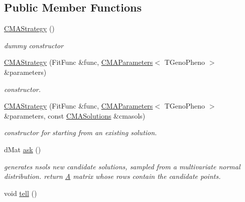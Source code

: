 \subsection*{Public Member Functions}
\begin{DoxyCompactItemize}
\item 
\hypertarget{classlibcmaes_1_1CMAStrategy_a855fbfb7dd9745ea764648f8965d1f3e}{\hyperlink{classlibcmaes_1_1CMAStrategy_a855fbfb7dd9745ea764648f8965d1f3e}{C\+M\+A\+Strategy} ()}\label{classlibcmaes_1_1CMAStrategy_a855fbfb7dd9745ea764648f8965d1f3e}

\begin{DoxyCompactList}\small\item\em dummy constructor \end{DoxyCompactList}\item 
\hyperlink{classlibcmaes_1_1CMAStrategy_a5455e7245be35c169e4144eb666f94f3}{C\+M\+A\+Strategy} (Fit\+Func \&func, \hyperlink{classlibcmaes_1_1CMAParameters}{C\+M\+A\+Parameters}$<$ T\+Geno\+Pheno $>$ \&parameters)
\begin{DoxyCompactList}\small\item\em constructor. \end{DoxyCompactList}\item 
\hyperlink{classlibcmaes_1_1CMAStrategy_a30decb362a4dd4c9557f0989d618aa93}{C\+M\+A\+Strategy} (Fit\+Func \&func, \hyperlink{classlibcmaes_1_1CMAParameters}{C\+M\+A\+Parameters}$<$ T\+Geno\+Pheno $>$ \&parameters, const \hyperlink{classlibcmaes_1_1CMASolutions}{C\+M\+A\+Solutions} \&cmasols)
\begin{DoxyCompactList}\small\item\em constructor for starting from an existing solution. \end{DoxyCompactList}\item 
\hypertarget{classlibcmaes_1_1CMAStrategy_ab7266bc50732458ffcab690bc26380e6}{d\+Mat \hyperlink{classlibcmaes_1_1CMAStrategy_ab7266bc50732458ffcab690bc26380e6}{ask} ()}\label{classlibcmaes_1_1CMAStrategy_ab7266bc50732458ffcab690bc26380e6}

\begin{DoxyCompactList}\small\item\em generates nsols new candidate solutions, sampled from a multivariate normal distribution. return \hyperlink{classA}{A} matrix whose rows contain the candidate points. \end{DoxyCompactList}\item 
\hypertarget{classlibcmaes_1_1CMAStrategy_a03d9a4f9338ccd55141323ca309dbdfa}{void \hyperlink{classlibcmaes_1_1CMAStrategy_a03d9a4f9338ccd55141323ca309dbdfa}{tell} ()}\label{classlibcmaes_1_1CMAStrategy_a03d9a4f9338ccd55141323ca309dbdfa}


\end{DoxyCompactItemize}
